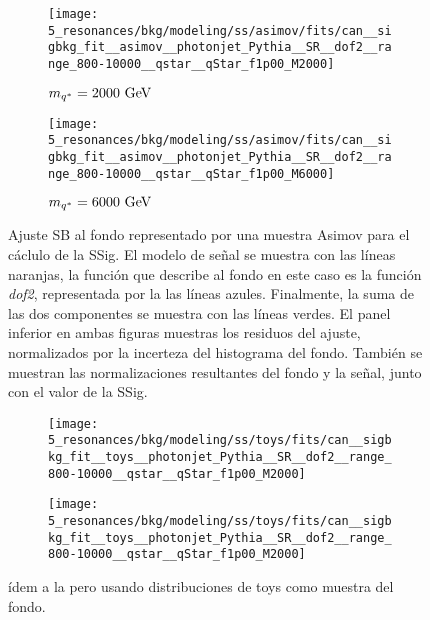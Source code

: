 \begin{figure}[ht!]
    \centering
    \begin{subfigure}[h]{0.49\linewidth}
        \centering
        \texttt{[image: 5\_resonances/bkg/modeling/ss/asimov/fits/can\_\_sigbkg\_fit\_\_asimov\_\_photonjet\_Pythia\_\_SR\_\_dof2\_\_range\_800-10000\_\_qstar\_\_qStar\_f1p00\_M2000]}
        \caption{\(m_{q^*} = 2000~\text{GeV}\)}
    \end{subfigure}
    \hfill
    \begin{subfigure}[h]{0.49\linewidth}
        \centering
        \texttt{[image: 5\_resonances/bkg/modeling/ss/asimov/fits/can\_\_sigbkg\_fit\_\_asimov\_\_photonjet\_Pythia\_\_SR\_\_dof2\_\_range\_800-10000\_\_qstar\_\_qStar\_f1p00\_M6000]}
        \caption{\(m_{q^*} = 6000~\text{GeV}\)}
    \end{subfigure}
    \caption{Ajuste \ac{SB} al fondo representado por una muestra Asimov para el cáclulo de la \ac{SSig}. El modelo de se\~nal se muestra con las líneas naranjas, la función que describe al fondo en este caso es la función \textit{dof2}, representada por la las líneas azules. Finalmente, la suma de las dos componentes se muestra con las líneas verdes. El panel inferior en ambas figuras muestras los residuos del ajuste, normalizados por la incerteza del histograma del fondo. También se muestran las normalizaciones resultantes del fondo y la se\~nal, junto con el valor de la \ac{SSig}.}
    \label{fig:bkg:modeling:sigbkg:sstest:sstest_asimov_examples}
\end{figure}

\begin{figure}[ht!]
    \centering
    \begin{subfigure}[h]{0.49\linewidth}
        \centering
        \texttt{[image: 5\_resonances/bkg/modeling/ss/toys/fits/can\_\_sigbkg\_fit\_\_toys\_\_photonjet\_Pythia\_\_SR\_\_dof2\_\_range\_800-10000\_\_qstar\_\_qStar\_f1p00\_M2000]}
    \end{subfigure}
    \hfill
    \begin{subfigure}[h]{0.49\linewidth}
        \centering
        \texttt{[image: 5\_resonances/bkg/modeling/ss/toys/fits/can\_\_sigbkg\_fit\_\_toys\_\_photonjet\_Pythia\_\_SR\_\_dof2\_\_range\_800-10000\_\_qstar\_\_qStar\_f1p00\_M2000]}
    \end{subfigure}
    \caption{ídem a la \Fig{\ref{fig:bkg:modeling:sigbkg:sstest:sstest_asimov_examples}} pero usando distribuciones de toys como muestra del fondo.}
    \label{fig:bkg:modeling:sigbkg:sstest:sstest_toys_examples}
\end{figure}

